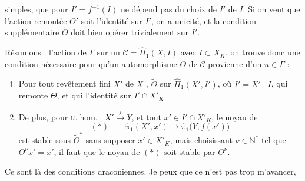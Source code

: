 \documentclass[11pt,a4paper]{article}
\begin{document}
 simples, que pour $I' = f^{-1}(I)$ ne dépend pas du choix de $I'$  de $I$. Si on veut que l'action remontée $\Theta'$ soit l'identité sur $I'$, on a unicité, et la condition supplémentaire   $\tilde{\Theta}$ doit bien opérer trivialement sur $I'$.

Résumons : l'action de $\Gamma$  sur un $\mathcal{C} = \hat{\Pi}_1(X, I)$ avec $I \subset X_K$, on trouve donc une condition nécessaire pour qu'un automorphisme $\Theta$ de $\mathcal{C}$  provienne d'un $u \in \Gamma$ :
\begin{enumerate}
  \item[a)] Pour tout revêtement fini  $X'$ de $X$ ,    $\tilde{\Theta}$  sur $\hat{\Pi}_1(X', I')$, où $I' = X' \mid I$, qui remonte $\Theta$, et qui  l'identité sur $I' \cap X'_K$.
  \item[b)] De plus, pour tt hom.\  $X' \xrightarrow{\;f\;} Y$, et tout $x' \in I' \cap X'_K$, le noyau de
  \[
    (*) \qquad \hat{\pi}_1(X', x') \longrightarrow \hat{\pi}_1\bigl(Y, f(x')\bigr)
  \]
   est stable sous $\tilde{\Theta}^{*}$  sans supposer $x' \in X'_K$, mais choisissant $\nu \in \mathbb{N}^{*}$ tel que $\Theta^{\nu} x' = x'$, il faut que \struck{\ill{}} le noyau de $(*)$ soit stable par $\Theta^{\nu}$.
\end{enumerate}

Ce sont là des conditions draconiennes. Je peux que ce n'est pas trop m'avancer,
\end{document}
